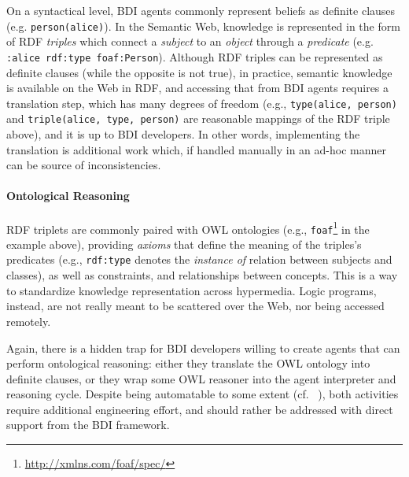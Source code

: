 \documentclass[
]{ceurart}
\begin{document}
On a syntactical level, 
\ac{BDI} agents commonly represent beliefs as definite clauses\missingref{} %
(e.g. \texttt{person(alice)}).
%
In the Semantic Web, 
knowledge is represented in the form of \ac{RDF} \emph{triples} which connect a \emph{subject} to an \emph{object} through a \emph{predicate} (e.g. \texttt{:alice rdf:type foaf:Person}).
%
Although \ac{RDF} triples can be represented as definite clauses 
(while the opposite is not true), 
in practice,
semantic knowledge is available on the Web in \ac{RDF},
and accessing that from \ac{BDI} agents requires a translation step,
which has many degrees of freedom
(e.g., \texttt{type(alice, person)} and \texttt{triple(alice, type, person)} are reasonable mappings of the \ac{RDF} triple above),
and it is up to \ac{BDI} developers.
%
In other words,
implementing the translation is additional work which, if handled manually in an ad-hoc manner can be source of inconsistencies.

\paragraph{Ontological Reasoning}

\ac{RDF} triplets are commonly paired with \ac{OWL} ontologies (e.g., \texttt{foaf}\footnote{\url{http://xmlns.com/foaf/spec/}} in the example above),
providing \emph{axioms} that define the meaning of the triples's predicates 
(e.g., \texttt{rdf:type} denotes the \emph{instance of} relation between subjects and classes),
as well as constraints, and relationships between concepts.
%
This is a way to standardize knowledge representation across hypermedia.
%
Logic programs, instead, are not really meant to be scattered over the Web,
nor being accessed remotely.

Again,
there is a hidden trap for \ac{BDI} developers willing to create agents that can perform ontological reasoning:
either they translate the \ac{OWL} ontology into definite clauses,
or they wrap some \ac{OWL} reasoner into the agent interpreter and reasoning cycle.
%
Despite being automatable to some extent (cf. ~\cite{samuel2008tplp}),
both activities require additional engineering effort,
and should rather be addressed with direct support from the \ac{BDI} framework.
\end{document}
